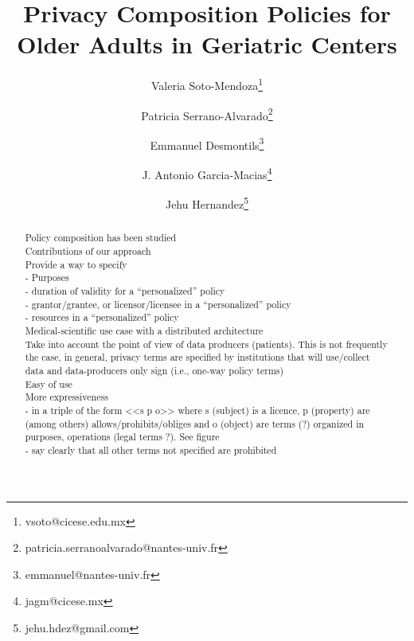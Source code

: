 \documentclass[10pt,letterpaper,oneside,draft]{article}
\begin{document}

\title{Privacy Composition Policies for Older Adults in Geriatric Centers}


\author[1]{Valeria Soto-Mendoza\thanks{vsoto@cicese.edu.mx}}
\author[2]{Patricia Serrano-Alvarado\thanks{patricia.serranoalvarado@nantes-univ.fr}}
\author[2]{Emmanuel Desmontils\thanks{emmanuel@nantes-univ.fr}}
\author[1]{J. Antonio Garcia-Macias\thanks{jagm@cicese.mx}}
\author[3]{Jehu Hernandez\thanks{jehu.hdez@gmail.com}}




\maketitle

\begin{abstract}
Policy composition has been studied 
\\
Contributions of our approach
\\
Provide a way to specify 
\\
- Purposes
\\
- duration of validity for a ``personalized'' policy
\\
- grantor/grantee, or licensor/licensee in a ``personalized'' policy
\\
- resources in a ``personalized'' policy
\\
Medical-scientific use case with a distributed architecture
\\
Take into account the point of view of data producers (patients). This is not frequently the case, in general, privacy terms are specified by institutions that will use/collect data and data-producers only sign (i.e., one-way policy terms) 
\\
Easy of use 
\\
More expressiveness
\\
- in a triple of the form <<s p o>> where s (subject) is a licence, p (property) are (among others) allows/prohibits/obliges and o (object) are terms (?) organized in purposes, operations (legal terms ?). See figure 
\\
- say clearly that all other terms not specified are prohibited

\end{abstract}
\end{document}
